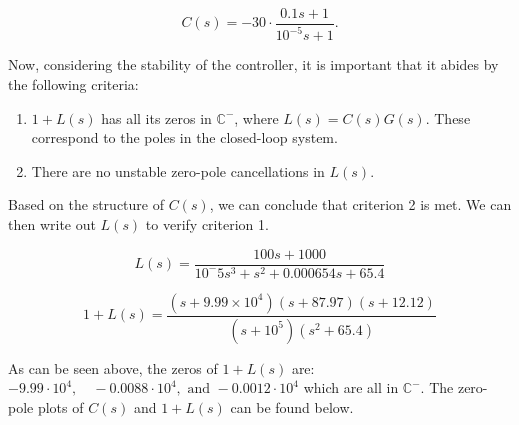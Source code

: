\documentclass[10pt]{article}
\begin{document}
\begin{equation*}
    C(s) = -30\cdot\frac{0.1s+1}{10^{-5}s+1}.
\end{equation*}

Now, considering the stability of the controller, it is important that it abides by the following criteria:

\begin{enumerate}
    \item $1 + L(s)$ has all its zeros in $\mathbb{C}^-$, where $L(s) = C(s)G(s)$. These correspond to the poles in the closed-loop system.
    \item There are no unstable zero-pole cancellations in $L(s)$.
\end{enumerate}

Based on the structure of $C(s)$, we can conclude that criterion 2 is met. We can then write out $L(s)$ to verify criterion 1.

\begin{equation*}
L(s) = \frac{100s + 1000}{10^-5s^3+s^2+0.000654s+65.4}
\end{equation*}

\begin{equation*}
    1+L(s) = \frac{(s + 9.99 \times 10^4)(s+87.97)(s+12.12)}{(s+10^5)(s^2+65.4)}
\end{equation*}

As can be seen above, the zeros of $1+L(s)$ are: $-9.99\cdot 10^4, \quad -0.0088\cdot 10^4, \text{ and } -0.0012\cdot 10^4$ which are all in $\mathbb{C}^-$. The zero-pole plots of $C(s)$ and $1 + L(s)$ can be found below.
\end{document}
